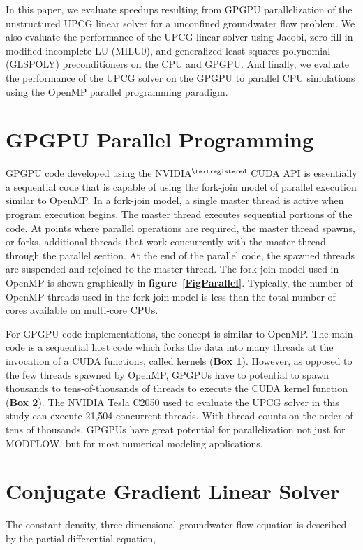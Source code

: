 \documentclass[12pt]{article}
\begin{document}
In this paper, we evaluate speedups resulting from GPGPU parallelization of the unstructured UPCG linear solver for a unconfined groundwater flow problem. We also evaluate the performance of the UPCG linear solver using Jacobi, zero fill-in modified incomplete LU (MILU0), and generalized least-squares polynomial (GLSPOLY) preconditioners on the CPU and GPGPU. And finally, we evaluate the performance of the UPCG solver on the GPGPU to parallel CPU simulations using the OpenMP parallel programming paradigm.

\section* {\bf GPGPU Parallel Programming}
GPGPU code developed using the NVIDIA$^{\textregistered}$ CUDA API is essentially a sequential code that is capable of using the fork-join model of parallel execution similar to OpenMP. In a fork-join model, a single master thread is active when program execution begins. The master thread executes sequential portions of the code. At points where parallel operations are required, the master thread spawns, or forks, additional threads that work concurrently with the master thread through the parallel section. At the end of the parallel code, the spawned threads are suspended and rejoined to the master thread. The fork-join model used in OpenMP is shown graphically in \textbf{figure~\ref{FigParallel}}. Typically, the number of OpenMP threads used in the fork-join model is less than the total number of cores available on multi-core CPUs.

For GPGPU code implementations, the concept is similar to OpenMP.  The main code is a sequential host code which forks the data into many threads at the invocation of a CUDA \color{blue}functions, called kernels (\textbf{Box 1})\color{black}.  \color{blue}However, as opposed to the few threads spawned by OpenMP, GPGPUs have to potential to spawn thousands to tens-of-thousands of threads to execute the CUDA kernel function (\textbf{Box 2}). The NVIDIA Tesla C2050 used to evaluate the UPCG solver in this study can execute 21,504 concurrent threads. \color{black} With thread counts on the order of tens of thousands, GPGPUs have great potential for parallelization \color{blue} not just for MODFLOW, but for most numerical modeling applications\color{black}.


\section* {\bf Conjugate Gradient Linear Solver}
The constant-density, three-dimensional groundwater flow equation is described by the partial-differential equation,
\end{document}
